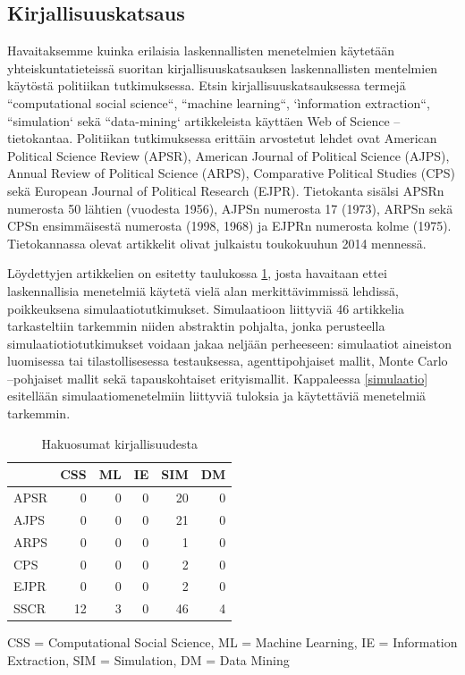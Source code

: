 \documentclass[finnish,gradu,twoside,12pt]{tktltiki}
\begin{document}
\subsection{Kirjallisuuskatsaus}

Havaitaksemme kuinka erilaisia laskennallisten menetelmien käytetään yhteiskuntatieteissä suoritan kirjallisuuskatsauksen laskennallisten mentelmien käytöstä politiikan tutkimuksessa. Etsin kirjallisuuskatsauksessa termejä ``computational social science``, ``machine learning``, `ìnformation extraction``, ``simulation` sekä ``data-mining` artikkeleista käyttäen Web of Science --tietokantaa. Politiikan tutkimuksessa erittäin arvostetut lehdet ovat American Political Science Review (APSR), American Journal of Political Science  (AJPS), Annual Review of Political Science (ARPS), Comparative Political Studies (CPS) sekä European Journal of Political Research (EJPR). Tietokanta sisälsi APSRn numerosta 50 lähtien (vuodesta 1956), AJPSn numerosta 17 (1973), ARPSn sekä CPSn ensimmäisestä numerosta (1998, 1968) ja EJPRn numerosta kolme (1975). Tietokannassa olevat artikkelit olivat julkaistu toukokuuhun 2014 mennessä. %

Löydettyjen artikkelien on esitetty taulukossa \ref{kirjallisuuskataus}, josta havaitaan ettei laskennallisia menetelmiä käytetä vielä alan merkittävimmissä lehdissä, poikkeuksena simulaatiotutkimukset. Simulaatioon liittyviä 46 artikkelia tarkasteltiin tarkemmin niiden abstraktin pohjalta, jonka perusteella simulaatiotiotutkimukset voidaan jakaa neljään perheeseen: simulaatiot aineiston luomisessa tai tilastollisesessa testauksessa, agenttipohjaiset mallit, Monte Carlo --pohjaiset mallit sekä tapauskohtaiset erityismallit. Kappaleessa \ref{simulaatio} esitellään simulaatiomenetelmiin liittyviä tuloksia ja käytettäviä menetelmiä tarkemmin.

\begin{table}

\begin{tabular}{lrrrrr}
~  & CSS & ML & IE  & SIM & DM \\
\hline
APSR  & 0 & 0 & 0 & 20 & 0 \\
AJPS  & 0 & 0 & 0 & 21 & 0 \\
ARPS  & 0 & 0 & 0 &  1 & 0 \\ 
CPS   & 0 & 0 & 0 &  2 & 0 \\
EJPR  & 0 & 0 & 0 &  2 & 0 \\
\hline
SSCR & 12 & 3 & 0 & 46 & 4  \\
\hline
\end{tabular}
\caption{Hakuosumat kirjallisuudesta}
CSS = Computational Social Science, ML = Machine Learning, IE = Information Extraction, SIM = Simulation, DM = Data Mining
\label{kirjallisuuskataus}

\end{table}
\end{document}
